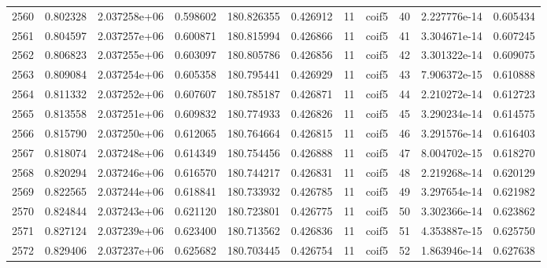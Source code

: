 \begin{tabular}{lrrrrrrlrrr}
2560 &    0.802328 &        2.037258e+06 &  0.598602 &              180.826355 &    0.426912 &      11 &        coif5 &     40 &   2.227776e-14 &      0.605434 \\
2561 &    0.804597 &        2.037257e+06 &  0.600871 &              180.815994 &    0.426866 &      11 &        coif5 &     41 &   3.304671e-14 &      0.607245 \\
2562 &    0.806823 &        2.037255e+06 &  0.603097 &              180.805786 &    0.426856 &      11 &        coif5 &     42 &   3.301322e-14 &      0.609075 \\
2563 &    0.809084 &        2.037254e+06 &  0.605358 &              180.795441 &    0.426929 &      11 &        coif5 &     43 &   7.906372e-15 &      0.610888 \\
2564 &    0.811332 &        2.037252e+06 &  0.607607 &              180.785187 &    0.426871 &      11 &        coif5 &     44 &   2.210272e-14 &      0.612723 \\
2565 &    0.813558 &        2.037251e+06 &  0.609832 &              180.774933 &    0.426826 &      11 &        coif5 &     45 &   3.290234e-14 &      0.614575 \\
2566 &    0.815790 &        2.037250e+06 &  0.612065 &              180.764664 &    0.426815 &      11 &        coif5 &     46 &   3.291576e-14 &      0.616403 \\
2567 &    0.818074 &        2.037248e+06 &  0.614349 &              180.754456 &    0.426888 &      11 &        coif5 &     47 &   8.004702e-15 &      0.618270 \\
2568 &    0.820294 &        2.037246e+06 &  0.616570 &              180.744217 &    0.426831 &      11 &        coif5 &     48 &   2.219268e-14 &      0.620129 \\
2569 &    0.822565 &        2.037244e+06 &  0.618841 &              180.733932 &    0.426785 &      11 &        coif5 &     49 &   3.297654e-14 &      0.621982 \\
2570 &    0.824844 &        2.037243e+06 &  0.621120 &              180.723801 &    0.426775 &      11 &        coif5 &     50 &   3.302366e-14 &      0.623862 \\
2571 &    0.827124 &        2.037239e+06 &  0.623400 &              180.713562 &    0.426836 &      11 &        coif5 &     51 &   4.353887e-15 &      0.625750 \\
2572 &    0.829406 &        2.037237e+06 &  0.625682 &              180.703445 &    0.426754 &      11 &        coif5 &     52 &   1.863946e-14 &      0.627638 \\

\end{tabular}
